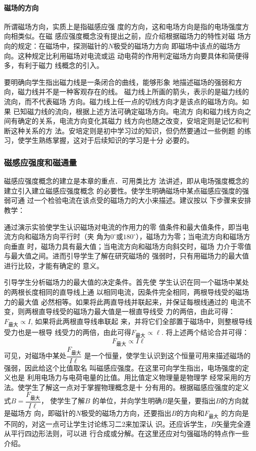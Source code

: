 \paragraph{磁场的方向}
所谓磁场方向，实质上是指磁感应强
度的方向，这和电场方向是指的电场强度方向相类似。在磁
感应强度概念没有提出之前，应介绍根据磁场力的特性对磁
场方向的规定：在磁场中，探测磁针的$N$极受的磁场力方向
即磁场中该点的磁场方向。这种规定比利用磁场对电流或运
动电荷的作用判定磁场方向要具体和简便得多，有利于磁力
线概念的引入。

要明确向学生指出磁力线是一条闭合的曲线，能够形象
地描述磁场的强弱和方向，磁力线并不是一种客观存在的线。
磁力线上所画的箭头，表示的是磁力线的流向，而不代表磁场
方向。磁力线上任一点的切线方向才是该点的磁场方向。如果
已知磁力线的流向，根据上述方法可确定磁场方向。电流方
向和磁力线方向之间有确定的关系，电流方向变化其磁力
线方向也随之改变，安培定则是记忆和判断这种关系的方
法。安培定则是初中学习过的知识，但仍然要通过一些例题
的练习，使学生熟练掌握，这对于后续知识的学习是十分
必要的。

\subsubsection{磁感应强度和磁通量}
磁感应强度概念的建立是本章的重点．可用类比方
法讲述，即从电场强度概念的建立引入建立磁感应强度概念
的必要性。使学生明确磁场中某点磁感应强度的强弱可通
过一个检验电流在该点受的磁场力的大小来描述。建议按以
下步骤来安排教学：

通过演示实验使学生认识磁场对电流的作用力的零
值条件和最大值条件，即当电流方向和磁场方向平行时（夹
角为$0^{\circ}$或$180^{\circ}$），磁场力为零；当电流方向和磁场方向垂直
时，磁场力具有最大值；当电流方向和磁场方向斜交时，磁场
力介于零值与最大值之间。进而引导学生了解在研究磁场的
强弱时，只有用磁场力的最大值进行比较，才能有确定的
意义。

引导学生分析磁场力的最大值的决定条件。首先使
学生认识在同一个磁场中某处的两根长度相同的直导线上通
以相同电流，因条件完全相同，两根导线受的磁场力的最大值
必然相等。如果将此两直导线并联起来，并保证每根线通过的
电流不变，则两根直导线受的磁场力最大值是一根直导线受
力的两倍，由此可得：$F_{\text{最大}}\propto I$, 如果将此两根直导线串联起
来，并将它们全部置于磁场中，则整根导线受力也是一根导
线受力的两倍，由此可得$F_{\text{最大}}\propto \ell$. 将上述两个结论合并可得：
\[F_{\text{最大}}\propto I\ell\]
可见，对磁场中某处$\dfrac{F_{\text{最大}}}{I\ell}$
是一个恒量，使学生认识到这个恒量可用来描述磁场的强弱，因此给这个比值取名
叫磁感应强度。在这里可向学生指出，电场强度的定义也是
利用电场力与电荷电量的比值。用比值定义物理量是物理学
经常采用的方法。使学生了解这一点对于掌握物理概念是十
分有用的。根据磁感应强度的定义
式$B=\dfrac{F_{\text{最大}}}{I\ell}$，
使学生了解$B$
的单位，并向学生明确$B$是矢量，要指出$B$的方向就是磁场方
向，即磁针的$N$极受的磁场力方向，还要指出$B$的方向和$F_{\text{最大}}$
的方向是不同的，对这一点可让学生讨论练习二2来加深认
识。还应诉学生，$B$矢量完全遵从平行四边形法则，可以进
行合成或分解。在这里还应对匀强磁场的特点作一些介绍。

